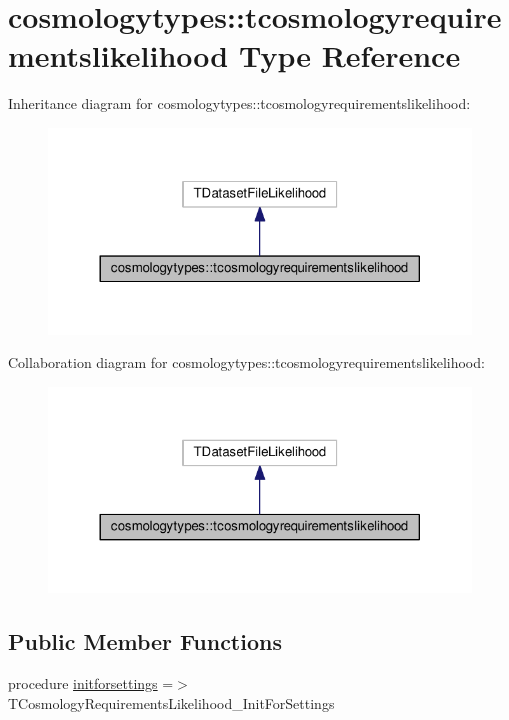 \hypertarget{structcosmologytypes_1_1tcosmologyrequirementslikelihood}{}\section{cosmologytypes\+:\+:tcosmologyrequirementslikelihood Type Reference}
\label{structcosmologytypes_1_1tcosmologyrequirementslikelihood}


Inheritance diagram for cosmologytypes\+:\+:tcosmologyrequirementslikelihood\+:
\nopagebreak
\begin{figure}[H]
\begin{center}
\leavevmode
\includegraphics[width=320pt]{structcosmologytypes_1_1tcosmologyrequirementslikelihood__inherit__graph}
\end{center}
\end{figure}


Collaboration diagram for cosmologytypes\+:\+:tcosmologyrequirementslikelihood\+:
\nopagebreak
\begin{figure}[H]
\begin{center}
\leavevmode
\includegraphics[width=320pt]{structcosmologytypes_1_1tcosmologyrequirementslikelihood__coll__graph}
\end{center}
\end{figure}
\subsection*{Public Member Functions}
\begin{DoxyCompactItemize}
\item 
procedure \mbox{\hyperlink{structcosmologytypes_1_1tcosmologyrequirementslikelihood_aee0f4596df0342419fe2a96e6f425994}{initforsettings}} =$>$ T\+Cosmology\+Requirements\+Likelihood\+\_\+\+Init\+For\+Settings
\end{DoxyCompactItemize}
